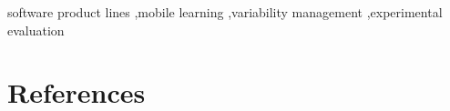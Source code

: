 \documentclass[preprint,12pt]{elsarticle}
\begin{document}
\begin{frontmatter}
\begin{keyword}
software product lines \sep mobile learning \sep variability management \sep experimental evaluation



\end{keyword}

\end{frontmatter}






















\section*{References}
\end{document}
